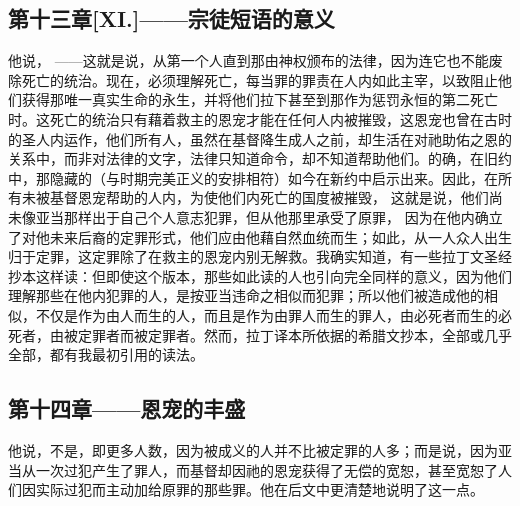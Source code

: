 
\subsection{第十三章[XI.]——宗徒短语的意义}

他说， ——这就是说，从第一个人直到那由神权颁布的法律，因为连它也不能废除死亡的统治。现在，必须理解死亡，每当罪的罪责在人内如此主宰，以致阻止他们获得那唯一真实生命的永生，并将他们拉下甚至到那作为惩罚永恒的第二死亡时。这死亡的统治只有藉着救主的恩宠才能在任何人内被摧毁，这恩宠也曾在古时的圣人内运作，他们所有人，虽然在基督降生成人之前，却生活在对祂助佑之恩的关系中，而非对法律的文字，法律只知道命令，却不知道帮助他们。的确，在旧约中，那隐藏的（与时期完美正义的安排相符）如今在新约中启示出来。因此，在所有未被基督恩宠帮助的人内，为使他们内死亡的国度被摧毁， 这就是说，他们尚未像亚当那样出于自己个人意志犯罪，但从他那里承受了原罪， 因为在他内确立了对他未来后裔的定罪形式，他们应由他藉自然血统而生；如此，从一人众人出生归于定罪，这定罪除了在救主的恩宠内别无解救。我确实知道，有一些拉丁文圣经抄本这样读：但即使这个版本，那些如此读的人也引向完全同样的意义，因为他们理解那些在他内犯罪的人，是按亚当违命之相似而犯罪；所以他们被造成他的相似，不仅是作为由人而生的人，而且是作为由罪人而生的罪人，由必死者而生的必死者，由被定罪者而被定罪者。然而，拉丁译本所依据的希腊文抄本，全部或几乎全部，都有我最初引用的读法。\par


\subsection{第十四章——恩宠的丰盛}

他说，不是，即更多人数，因为被成义的人并不比被定罪的人多；而是说，因为亚当从一次过犯产生了罪人，而基督却因祂的恩宠获得了无偿的宽恕，甚至宽恕了人们因实际过犯而主动加给原罪的那些罪。他在后文中更清楚地说明了这一点。\par

